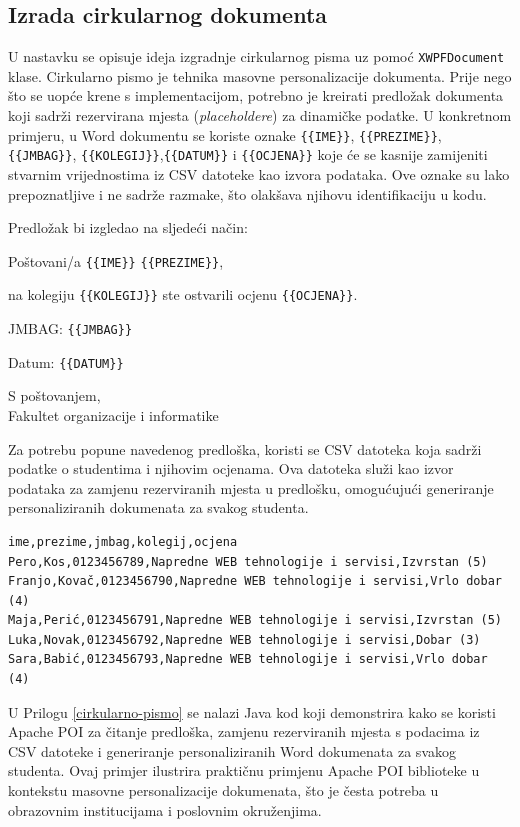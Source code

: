 \documentclass[]{foi}
\begin{document}
\subsection{Izrada cirkularnog dokumenta}

U nastavku se opisuje ideja izgradnje cirkularnog pisma uz pomoć \texttt{XWPFDocument} klase. Cirkularno pismo je tehnika masovne personalizacije dokumenta. Prije nego što se uopće krene s implementacijom, potrebno je kreirati predložak dokumenta koji sadrži rezervirana mjesta (\emph{placeholdere}) za dinamičke podatke. U konkretnom primjeru, u Word dokumentu se koriste oznake \texttt{\{\{IME\}\}}, \texttt{\{\{PREZIME\}\}}, \texttt{\{\{JMBAG\}\}}, \texttt{\{\{KOLEGIJ\}\}},\texttt{\{\{DATUM\}\}}  i \texttt{\{\{OCJENA\}\}} koje će se kasnije zamijeniti stvarnim vrijednostima iz CSV datoteke kao izvora podataka. Ove oznake su lako prepoznatljive i ne sadrže razmake, što olakšava njihovu identifikaciju u kodu.

Predložak bi izgledao na sljedeći način:

\begin{mdframed}
Poštovani/a \texttt{\{\{IME\}\}} \texttt{\{\{PREZIME\}\}},

na kolegiju \texttt{\{\{KOLEGIJ\}\}} ste ostvarili ocjenu \texttt{\{\{OCJENA\}\}}.

JMBAG: \texttt{\{\{JMBAG\}\}}

Datum: \texttt{\{\{DATUM\}\}}

S poštovanjem,\\
Fakultet organizacije i informatike
\end{mdframed}

Za potrebu popune navedenog predloška, koristi se CSV datoteka koja sadrži podatke o studentima i njihovim ocjenama. Ova datoteka služi kao izvor podataka za zamjenu rezerviranih mjesta u predlošku, omogućujući generiranje personaliziranih dokumenata za svakog studenta.

\begin{lstlisting}[style=csv, caption={Datoteka studenti.csv}]
ime,prezime,jmbag,kolegij,ocjena
Pero,Kos,0123456789,Napredne WEB tehnologije i servisi,Izvrstan (5)
Franjo,Kovač,0123456790,Napredne WEB tehnologije i servisi,Vrlo dobar (4)
Maja,Perić,0123456791,Napredne WEB tehnologije i servisi,Izvrstan (5)
Luka,Novak,0123456792,Napredne WEB tehnologije i servisi,Dobar (3)
Sara,Babić,0123456793,Napredne WEB tehnologije i servisi,Vrlo dobar (4)
\end{lstlisting}

U Prilogu \ref{cirkularno-pismo} se nalazi Java kod koji demonstrira kako se koristi Apache POI za čitanje predloška, zamjenu rezerviranih mjesta s podacima iz CSV datoteke i generiranje personaliziranih Word dokumenata za svakog studenta. Ovaj primjer ilustrira praktičnu primjenu Apache POI biblioteke u kontekstu masovne personalizacije dokumenata, što je česta potreba u obrazovnim institucijama i poslovnim okruženjima.
\end{document}
